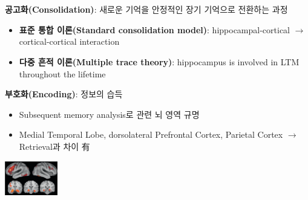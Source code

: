 \documentclass{beamer}
\begin{document}
\begin{frame}
  \\~\\
  \textbf{공고화(Consolidation)}: 새로운 기억을 안정적인 장기 기억으로 전환하는 과정
  \begin{itemize}
    \small
    \item \textbf{표준 통합 이론(Standard consolidation model)}: hippocampal-cortical $\rightarrow$ cortical-cortical interaction
    \item \textbf{다중 흔적 이론(Multiple trace theory)}: hippocampus is involved in LTM throughout the lifetime
  \end{itemize}
  \vspace{1.5em}
  \textbf{부호화(Encoding)}: 정보의 습득
  \begin{minipage}{0.7\textwidth}
    \vspace{-1em}
    \begin{itemize}
      \item Subsequent memory analysis로 관련 뇌 영역 규명
      \item Medial Temporal Lobe, dorsolateral Prefrontal Cortex, Parietal Cortex $\rightarrow$ Retrieval과 차이 有
    \end{itemize}
    \hfill
  \end{minipage}%
  \begin{minipage}{0.3\textwidth}
    \vspace{-2em}
    \centering
    \includegraphics[height=1.5cm]{image/encoding_brain_regions}
  \end{minipage}


\end{frame}
\end{document}
